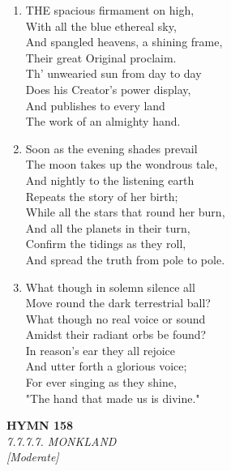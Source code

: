 \begin{enumerate}
    \item THE spacious firmament on high, \\
        With all the blue ethereal sky, \\
        And spangled heavens, a shining frame, \\
        Their great Original proclaim. \\
        Th' unwearied sun from day to day \\
        Does his Creator's power display, \\
        And publishes to every land \\
        The work of an almighty hand.

    \item Soon as the evening shades prevail \\
        The moon takes up the wondrous tale, \\
        And nightly to the listening earth \\
        Repeats the story of her birth; \\
        While all the stars that round her burn, \\
        And all the planets in their turn, \\
        Confirm the tidings as they roll, \\
        And spread the truth from pole to pole.

    \item What though in solemn silence all \\
        Move round the dark terrestrial ball? \\
        What though no real voice or sound \\
        Amidst their radiant orbs be found? \\
        In reason's ear they all rejoice \\
        And utter forth a glorious voice; \\
        For ever singing as they shine, \\
        "The hand that made us is divine."

\end{enumerate}

\newpage
\begin{center}
    {\Large \textbf{HYMN 158}}
    \\
    \textit{7.7.7.7. MONKLAND}
    \\
    \textit{\small [Moderate]}
\end{center}
\vspace{1em}

